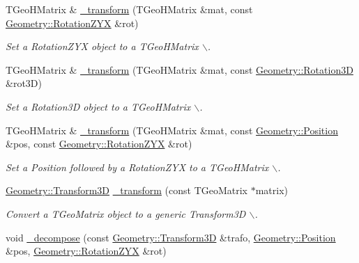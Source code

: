 \begin{DoxyCompactItemize}
TGeoHMatrix \& \hyperlink{group___d_d4_h_e_p___g_e_o_m_e_t_r_y_gae00745e30557512fe1da42fc705d42d1}{\_\-transform} (TGeoHMatrix \&mat, const \hyperlink{namespace_d_d4hep_1_1_geometry_a24667b2b9c3cec3d5239828db4d52189}{Geometry::RotationZYX} \&rot)
\begin{DoxyCompactList}\small\item\em Set a RotationZYX object to a TGeoHMatrix $\backslash$. \item\end{DoxyCompactList}\item 
TGeoHMatrix \& \hyperlink{group___d_d4_h_e_p___g_e_o_m_e_t_r_y_ga249607824f27e539ae7a6d93d367afc6}{\_\-transform} (TGeoHMatrix \&mat, const \hyperlink{namespace_d_d4hep_1_1_geometry_a022fecb763315fa2bf39cbb648944a0e}{Geometry::Rotation3D} \&rot3D)
\begin{DoxyCompactList}\small\item\em Set a Rotation3D object to a TGeoHMatrix $\backslash$. \item\end{DoxyCompactList}\item 
TGeoHMatrix \& \hyperlink{group___d_d4_h_e_p___g_e_o_m_e_t_r_y_ga71170881a8a2e3803a68f7e55d237188}{\_\-transform} (TGeoHMatrix \&mat, const \hyperlink{namespace_d_d4hep_1_1_geometry_a55083902099d03506c6db01b80404900}{Geometry::Position} \&pos, const \hyperlink{namespace_d_d4hep_1_1_geometry_a24667b2b9c3cec3d5239828db4d52189}{Geometry::RotationZYX} \&rot)
\begin{DoxyCompactList}\small\item\em Set a Position followed by a RotationZYX to a TGeoHMatrix $\backslash$. \item\end{DoxyCompactList}\item 
\hyperlink{namespace_d_d4hep_1_1_geometry_aeb4c0356d12fd7be49a0aae50514e64b}{Geometry::Transform3D} \hyperlink{group___d_d4_h_e_p___g_e_o_m_e_t_r_y_ga7d9b7297bf0cee38d702a6e460a030a1}{\_\-transform} (const TGeoMatrix $\ast$matrix)
\begin{DoxyCompactList}\small\item\em Convert a TGeoMatrix object to a generic Transform3D $\backslash$. \item\end{DoxyCompactList}\item 
void \hyperlink{group___d_d4_h_e_p___g_e_o_m_e_t_r_y_ga9bb962c6fc39a0f8fc76420e08d24c7a}{\_\-decompose} (const \hyperlink{namespace_d_d4hep_1_1_geometry_aeb4c0356d12fd7be49a0aae50514e64b}{Geometry::Transform3D} \&trafo, \hyperlink{namespace_d_d4hep_1_1_geometry_a55083902099d03506c6db01b80404900}{Geometry::Position} \&pos, \hyperlink{namespace_d_d4hep_1_1_geometry_a24667b2b9c3cec3d5239828db4d52189}{Geometry::RotationZYX} \&rot)

\end{DoxyCompactItemize}
